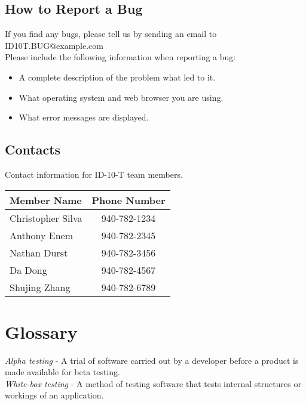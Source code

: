 \documentclass{scrreprt}
\begin{document}
	\section{How to Report a Bug}
	If you find any bugs, please tell us by sending an email to ID10T.BUG@example.com\\
	Please include the following information when reporting a bug:\\
	\begin{itemize}
		\item A complete description of the problem what led to it.
		\item What operating system and web browser you are using.
		\item What error messages are displayed.
	\end{itemize}
	
	\section{Contacts}
		Contact information for ID-10-T team members.\\
		\begin{tabular}{|l|c|}
			\hline
			Member Name       & Phone Number \\ \hline
			Christopher Silva & 940-782-1234 \\ \hline
			Anthony Enem      & 940-782-2345 \\ \hline
			Nathan Durst      & 940-782-3456 \\ \hline
			Da Dong           & 940-782-4567 \\ \hline
			Shujing Zhang     & 940-782-6789 \\ \hline
		\end{tabular}
	
	{\let\clearpage\relax \chapter{Glossary}}
	\textit{Alpha testing} - A trial of software carried out by a developer before a product is made available for beta testing.\\
	
	\textit{White-box testing} - A method of testing software that tests internal structures or workings of an application. 
\end{document}
